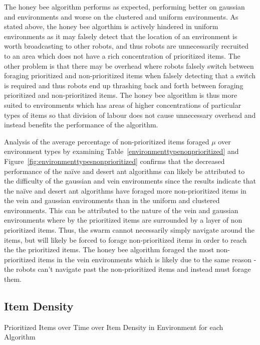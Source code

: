 The honey bee algorithm performs as expected, performing better on gaussian and environments and worse on the clustered and uniform environments. As stated above, the honey bee algorthim is actively hindered in uniform environments as it may falsely detect that the location of an environment is worth broadcasting to other robots, and thus robots are unnecessarily recruited to an area which does not have a rich concentration of prioritized items. The other problem is that there may be overhead where robots falsely switch between foraging prioritized and non-prioritized items when falsely detecting that a switch is required and thus robots end up thrashing back and forth between foraging prioritized and non-prioritized items. The honey bee algorithm is thus more suited to environments which has areas of higher concentrations of particular types of items so that division of labour does not cause unnecessary overhead and instead benefits the performance of the algorithm. 

Analysis of the average percentage of non-prioritized items foraged $\mu$ over environment types by examining Table~\ref{environmenttypenonprioritized} and Figure~\ref{fig:environmenttypesnonprioritized} confirms  that the decreased performance of the na\"ive and desert ant algorithms can likely be attributed to the difficulty of the gaussian and vein environments since the results indicate that the na\"ive and desert ant algorithms have foraged more non-prioritized items in the vein and gaussian environments than in the uniform and clustered environments. This can be attributed to the nature of the vein and gaussian environments where by the prioritized items are surrounded by a layer of non prioritized items. Thus, the swarm cannot necessarily simply navigate around the items, but will likely be forced to forage non-prioritized items in order to reach the the prioritized items. The honey bee algorithm foraged the most non-prioritized items in the vein environments which is likely due to the same reason - the robots can't navigate past the non-prioritized items and instead must forage them. 

\subsection{Item Density}
\label{results:itemdensity}

\begin{table} [h]
     \caption{Prioritized Items over Time over Item Density in Environment for each Algorithm}
     \label{itemdensityprioritized}
	\centering
	\footnotesize
	
\end{table}

